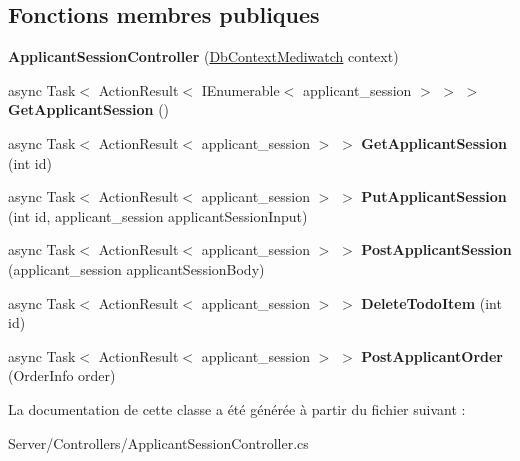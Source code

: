 \subsection*{Fonctions membres publiques}
\begin{DoxyCompactItemize}
\item 
\mbox{\label{class_mediwatch_1_1_server_1_1_controllers_1_1_applicant_session_controller_a25bd4d18e93861e4d99e672b127db48b}} 
{\bfseries Applicant\+Session\+Controller} (\hyperlink{class_server_1_1_db_context_mediwatch}{Db\+Context\+Mediwatch} context)
\item 
\mbox{\label{class_mediwatch_1_1_server_1_1_controllers_1_1_applicant_session_controller_adf8d12f5dcaaa4395522c8febae1e735}} 
async Task$<$ Action\+Result$<$ I\+Enumerable$<$ applicant\+\_\+session $>$ $>$ $>$ {\bfseries Get\+Applicant\+Session} ()
\item 
\mbox{\label{class_mediwatch_1_1_server_1_1_controllers_1_1_applicant_session_controller_ada65188cced0326a54f824a251869f02}} 
async Task$<$ Action\+Result$<$ applicant\+\_\+session $>$ $>$ {\bfseries Get\+Applicant\+Session} (int id)
\item 
\mbox{\label{class_mediwatch_1_1_server_1_1_controllers_1_1_applicant_session_controller_a9b9428a2f0209f15ef65b1262e220234}} 
async Task$<$ Action\+Result$<$ applicant\+\_\+session $>$ $>$ {\bfseries Put\+Applicant\+Session} (int id, applicant\+\_\+session applicant\+Session\+Input)
\item 
\mbox{\label{class_mediwatch_1_1_server_1_1_controllers_1_1_applicant_session_controller_a58d68c490175d8d0a13aa0104a36aed8}} 
async Task$<$ Action\+Result$<$ applicant\+\_\+session $>$ $>$ {\bfseries Post\+Applicant\+Session} (applicant\+\_\+session applicant\+Session\+Body)
\item 
\mbox{\label{class_mediwatch_1_1_server_1_1_controllers_1_1_applicant_session_controller_af3f0c4921fadd1483d25e39df7d5a857}} 
async Task$<$ Action\+Result$<$ applicant\+\_\+session $>$ $>$ {\bfseries Delete\+Todo\+Item} (int id)
\item 
\mbox{\label{class_mediwatch_1_1_server_1_1_controllers_1_1_applicant_session_controller_a0b7fdab1b6400c915d0a685d0c69303c}} 
async Task$<$ Action\+Result$<$ applicant\+\_\+session $>$ $>$ {\bfseries Post\+Applicant\+Order} (Order\+Info order)
\end{DoxyCompactItemize}


La documentation de cette classe a été générée à partir du fichier suivant \+:\begin{DoxyCompactItemize}
\item 
Server/\+Controllers/Applicant\+Session\+Controller.\+cs\end{DoxyCompactItemize}
